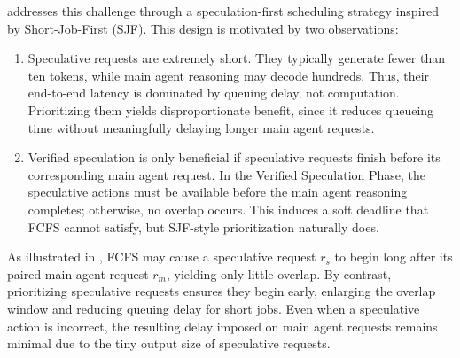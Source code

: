 \system addresses this challenge through a speculation-first scheduling strategy inspired by Short-Job-First (SJF).
This design is motivated by two observations:
\begin{enumerate}[leftmargin=*]
    \item Speculative requests are extremely short.
    They typically generate fewer than ten tokens, while main agent reasoning may decode hundreds.
    Thus, their end-to-end latency is dominated by queuing delay, not computation.
    Prioritizing them yields disproportionate benefit, since it reduces queueing time without meaningfully delaying longer main agent requests.
    \item Verified speculation is only beneficial if speculative requests finish before its corresponding main agent request.
    In the Verified Speculation Phase, the speculative actions must be available before the main agent reasoning completes; otherwise, no overlap occurs.
    This induces a soft deadline that FCFS cannot satisfy, but SJF-style prioritization naturally does.
\end{enumerate}



As illustrated in , FCFS may cause a speculative request $r_s$ to begin long after its paired main agent request $r_m$, yielding only little overlap.
By contrast, prioritizing speculative requests ensures they begin early, enlarging the overlap window and reducing queuing delay for short jobs.
Even when a speculative action is incorrect, the resulting delay imposed on main agent requests remains minimal due to the tiny output size of speculative requests.
